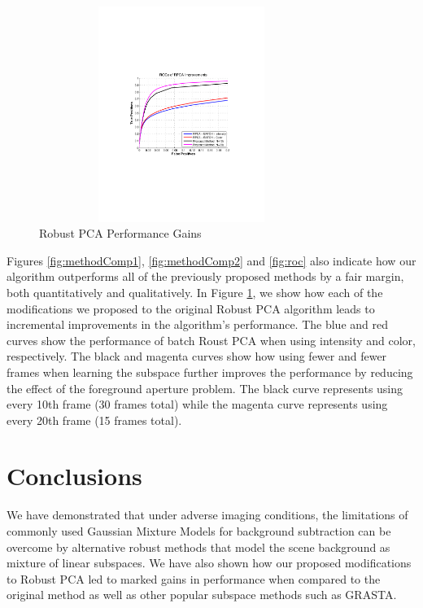 \documentclass{article}
\begin{document}
\begin{figure}[t]
\begin{minipage}[b]{\linewidth}
  \centering
  \centerline{\includegraphics[trim = 35mm 87mm 30mm 87mm, clip, width=9.25cm, height = 7cm]{Imgs/ROC_RPCA_IMP.pdf}}
\end{minipage}

\caption{Robust PCA Performance Gains}
\label{fig:roc2}
\vspace{-0.15in}
\end{figure}


Figures \ref{fig:methodComp1}, \ref{fig:methodComp2} and \ref{fig:roc} also indicate how our algorithm outperforms all of the previously proposed methods by a fair margin, both quantitatively and qualitatively. In Figure \ref{fig:roc2}, we show how each of the modifications we proposed to the original Robust PCA algorithm leads to incremental improvements in the algorithm's performance. The blue and red curves show the performance of batch Roust PCA when using intensity and color, respectively. The black and magenta curves show how using fewer and fewer frames when learning the subspace further improves the performance by reducing the effect of the foreground aperture problem. The black curve represents using every 10th frame (30 frames total) while the magenta curve represents using every 20th frame (15 frames total). 



\section{Conclusions}
We have demonstrated that under adverse imaging conditions, the limitations of commonly used Gaussian Mixture Models for background subtraction can be overcome by alternative robust methods that model the scene background as mixture of linear subspaces. We have also shown how our proposed modifications to Robust PCA led to marked gains in performance when compared to the original method as well as other popular subspace methods such as GRASTA.
\end{document}
